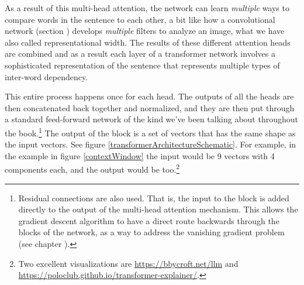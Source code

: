 
As a result of this multi-head attention, the network can learn \emph{multiple} ways to compare words in the sentence to each other, a bit like how a convolutional network (section ) develops \emph{multiple} filters to analyze an image, what we have also called representational width. The results of these different attention heads are combined and as a result each layer of a transformer network involves a sophisticated representation of the sentence that represents multiple types of inter-word dependency. 

This entire process happens once for each head. The outputs of all the heads are then concatenated back together and normalized, and they are then put through a standard feed-forward network of the kind we've been talking about throughout the book.\footnote{Residual connections are also used. That is, the input to the block is added directly to the output of the multi-head attention mechanism. This allows the gradient descent algorithm to have a direct route backwards through the blocks of the network, as a way to address the vanishing gradient problem (see chapter ). }  The output of the block is a set of vectors that has the same shape as the input vectors. See figure \ref{transformerArchitectureSchematic}. For example, in the example in figure \ref{contextWindow} the input would be 9 vectors with 4 components each, and the output would be too.\footnote{Two excellent visualizations are \url{https://bbycroft.net/llm} and \url{https://poloclub.github.io/transformer-explainer/}.}


